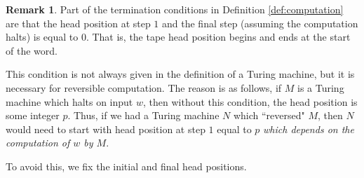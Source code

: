 \documentclass[12pt]{article}
\theoremstyle{plain}
\theoremstyle{definition}
\newtheorem{remark}[thm]{Remark}
\begin{document}
	\begin{remark}
		Part of the termination conditions in Definition \ref{def:computation} are that the head position at step $1$ and the final step (assuming the computation halts) is equal to $0$. That is, the tape head position begins and ends at the start of the word.
		
		This condition is not always given in the definition of a Turing machine, but it is necessary for reversible computation. The reason is as follows, if $M$ is a Turing machine which halts on input $w$, then without this condition, the head position is some integer $p$. Thus, if we had a Turing machine $N$ which ``reversed" $M$, then $N$ would need to start with head position at step $1$ equal to $p$ \emph{which depends on the computation of $w$ by $M$}.
		
		To avoid this, we fix the initial and final head positions.
		\end{remark}
		
\end{document}

